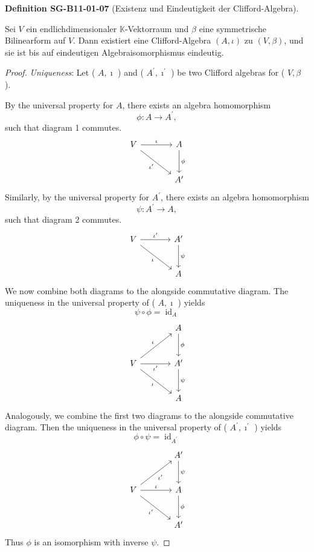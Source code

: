 \documentclass[10pt, letterpaper]{article}
\newcommand{\CustomHeading}[3]{%
  \par\medskip\noindent%
  \textbf{#1 #2} \textnormal{(#3)}.\enskip%
}
\newenvironment{DEF}[2]{\begin{unitbox}\CustomHeading{Definition}{#1}{#2}}{\end{unitbox}}
\begin{document}
\begin{DEF}{SG-B11-01-07}{Existenz und Eindeutigkeit der Clifford-Algebra}
Sei $V$ ein endlichdimensionaler $\mathbb K$-Vektorraum und $\beta$ eine symmetrische Bilinearform auf $V$.  
Dann existiert eine Clifford-Algebra $(A,\iota)$ zu $(V,\beta)$, und sie ist bis auf eindeutigen Algebraisomorphismus eindeutig.


\begin{proof} \emph{Uniqueness}: Let ( $A, \imath$ ) and ( $A^{\prime}, \imath^{\prime}$ ) be two Clifford algebras for ( $V, \beta$ ).

By the universal property for $A$, there exists an algebra homomorphism
$$
\phi: A \rightarrow A^{\prime},
$$
such that diagram 1 commutes.
\[
\begin{tikzcd}[row sep=large, column sep=large]
V \arrow[r, "\iota"] \arrow[dr, "\iota'"'] & A \arrow[d, "\phi"] \\
& A'
\end{tikzcd}
\]
Similarly, by the universal property for $A^{\prime}$, there exists an algebra homomorphism
$$
\psi: A^{\prime} \rightarrow A,
$$
such that diagram 2 commutes.
\[
\begin{tikzcd}[row sep=large, column sep=large]
V \arrow[r, "\iota'"] \arrow[dr, "\iota"'] & A' \arrow[d, "\psi"] \\
& A
\end{tikzcd}
\]
We now combine both diagrams to the alongside commutative diagram. The uniqueness in the universal property of ( $A, \imath$ ) yields
$$
\psi \circ \phi=\operatorname{id}_{A}
$$
\[
\begin{tikzcd}[row sep=large, column sep=large]
& A \arrow[d, "\phi"] \\
V \arrow[ur, "\iota"] \arrow[r, "\iota'"'] \arrow[dr, "\iota"'] & A' \arrow[d, "\psi"] \\
& A
\end{tikzcd}
\]
Analogously, we combine the first two diagrams to the alongside commutative diagram. Then the uniqueness in the universal property of ( $A^{\prime}, \imath^{\prime}$ ) yields
$$
\phi \circ \psi=\operatorname{id}_{A^{\prime}}
$$
\[
\begin{tikzcd}[row sep=large, column sep=large]
& A' \arrow[d, "\psi"] \\
V \arrow[ur, "\iota'"'] \arrow[r, "\iota"] \arrow[dr, "\iota'"'] & A \arrow[d, "\phi"] \\
& A'
\end{tikzcd}
\]
Thus $\phi$ is an isomorphism with inverse $\psi$.


\end{proof}
\end{DEF}
\end{document}
